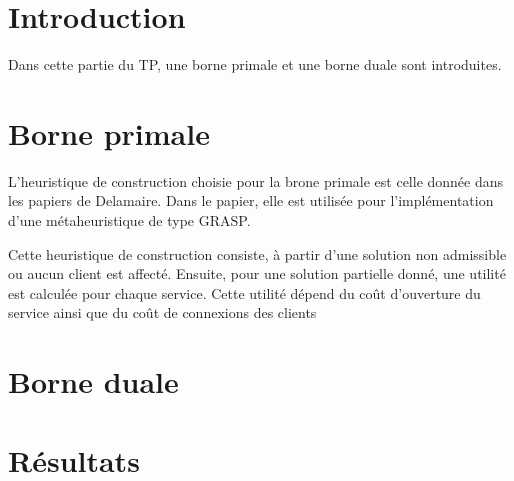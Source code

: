 \section{Introduction}

Dans cette partie du TP, une borne primale et une borne duale sont introduites.

\section{Borne primale}

L'heuristique de construction choisie pour la brone primale est celle donnée dans les papiers de Delamaire.
Dans le papier, elle est utilisée pour l'implémentation d'une métaheuristique de type GRASP. \newline

Cette heuristique de construction consiste, à partir d'une solution non admissible ou aucun client est affecté.
Ensuite, pour une solution partielle donné, une utilité est calculée pour chaque service.
Cette utilité dépend du coût d'ouverture du service ainsi que du coût de connexions des clients

\section{Borne duale}

\section{Résultats}
